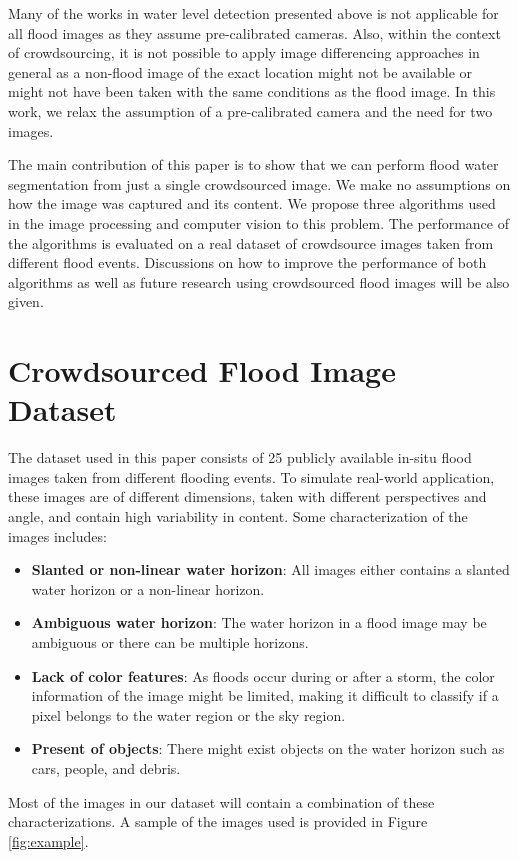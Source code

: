 \documentclass[review]{elsarticle}
\begin{document}
Many of the works in water level detection presented above is not applicable for all flood images as they assume pre-calibrated cameras. Also, within the context of crowdsourcing, it is not possible to apply image differencing approaches in general as a non-flood image of the exact location might not be available or might not have been taken with the same conditions as the flood image. In this work, we relax the assumption of a pre-calibrated camera and the need for two images.

The main contribution of this paper is to show that we can perform flood water segmentation from just a single  crowdsourced image. We make no assumptions on how the image was captured and its content. We propose three algorithms used in the image processing and computer vision to this problem. The performance of the algorithms is evaluated on a real dataset of crowdsource images taken from different flood events. Discussions on how to improve the performance of both algorithms as well as future research using crowdsourced flood images will be also given.

\section{Crowdsourced Flood Image Dataset}

The dataset used in this paper consists of 25 publicly available in-situ flood images taken from different flooding events. To simulate real-world application, these images are of different dimensions, taken with different perspectives and angle, and contain high variability in content. Some characterization of the images includes:

\begin{itemize}
\item {\bf Slanted or non-linear water horizon}: All images either contains a slanted water horizon or a non-linear horizon.
\item {\bf Ambiguous water horizon}: The water horizon in a flood image may be ambiguous or there can be multiple horizons.
\item {\bf Lack of color features}: As floods occur during or after a storm, the color information of the image might be limited, making it difficult to classify if a pixel belongs to the water region or the sky region.
\item {\bf Present of objects}: There might exist objects on the water horizon such as cars, people, and debris.
\end{itemize}
Most of the images in our dataset will contain a combination of these characterizations. A sample of the images used is provided in Figure \ref{fig:example}.
\end{document}
